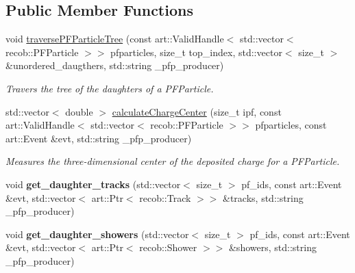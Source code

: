 \subsection*{Public Member Functions}
\begin{DoxyCompactItemize}
\item 
void \hyperlink{classlee_1_1PandoraInterfaceHelper_a43b81ca3b961e30d191ebc53f987cf2a}{traverse\-P\-F\-Particle\-Tree} (const art\-::\-Valid\-Handle$<$ std\-::vector$<$ recob\-::\-P\-F\-Particle $>$$>$ pfparticles, size\-\_\-t top\-\_\-index, std\-::vector$<$ size\-\_\-t $>$ \&unordered\-\_\-daugthers, std\-::string \-\_\-pfp\-\_\-producer)
\begin{DoxyCompactList}\small\item\em Travers the tree of the daughters of a P\-F\-Particle. \end{DoxyCompactList}\item 
std\-::vector$<$ double $>$ \hyperlink{classlee_1_1PandoraInterfaceHelper_a5434c10225e008643b7b9a48fd2e9bea}{calculate\-Charge\-Center} (size\-\_\-t ipf, const art\-::\-Valid\-Handle$<$ std\-::vector$<$ recob\-::\-P\-F\-Particle $>$$>$ pfparticles, const art\-::\-Event \&evt, std\-::string \-\_\-pfp\-\_\-producer)
\begin{DoxyCompactList}\small\item\em Measures the three-\/dimensional center of the deposited charge for a P\-F\-Particle. \end{DoxyCompactList}\item 
\hypertarget{classlee_1_1PandoraInterfaceHelper_ab0c4a8fd1bac60bb44cd26e0541feffa}{void {\bfseries get\-\_\-daughter\-\_\-tracks} (std\-::vector$<$ size\-\_\-t $>$ pf\-\_\-ids, const art\-::\-Event \&evt, std\-::vector$<$ art\-::\-Ptr$<$ recob\-::\-Track $>$$>$ \&tracks, std\-::string \-\_\-pfp\-\_\-producer)}\label{classlee_1_1PandoraInterfaceHelper_ab0c4a8fd1bac60bb44cd26e0541feffa}

\item 
\hypertarget{classlee_1_1PandoraInterfaceHelper_a89f77d090524bc3060a40330635527d5}{void {\bfseries get\-\_\-daughter\-\_\-showers} (std\-::vector$<$ size\-\_\-t $>$ pf\-\_\-ids, const art\-::\-Event \&evt, std\-::vector$<$ art\-::\-Ptr$<$ recob\-::\-Shower $>$$>$ \&showers, std\-::string \-\_\-pfp\-\_\-producer)}\label{classlee_1_1PandoraInterfaceHelper_a89f77d090524bc3060a40330635527d5}


\end{DoxyCompactItemize}
